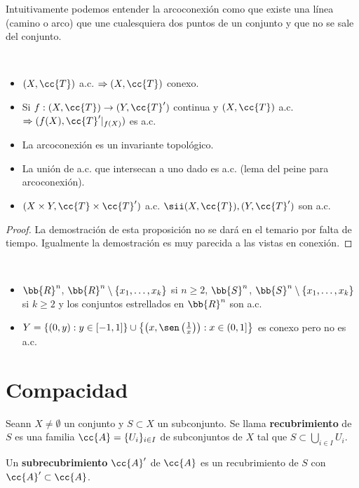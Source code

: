 Intuitivamente podemos entender la arcoconexión como que existe una línea (camino o arco) que une cualesquiera dos puntos de un conjunto y que no se sale del conjunto.

\begin{prop}\
    \begin{itemize}
        \item $(X, \cc{T})$ a.c. $\Rightarrow (X, \cc{T})$ conexo.
        \item Si $f:(X, \cc{T})\to (Y, \cc{T}')$ continua y $(X, \cc{T})$ a.c. $\Rightarrow (f(X), \cc{T}'|_{f(X)})$ es a.c.
        \item La arcoconexión es un invariante topológico.
        \item La unión de a.c. que intersecan a uno dado es a.c. (lema del peine para arcoconexión).
        \item $(X\times Y, \cc{T}\times \cc{T}')$ a.c. $\sii (X, \cc{T}), (Y, \cc{T}')$ son a.c.
    \end{itemize}
    \begin{proof}
        La demostración de esta proposición no se dará en el temario por falta de tiempo. Igualmente la demostración es muy parecida a las vistas en conexión.
    \end{proof}
\end{prop}

\begin{ejemplo}\
    \begin{itemize}
        \item $\bb{R}^n$, $\bb{R}^n\setminus \{x_1,\dots,x_k\}$ si $n\geq 2$, $\bb{S}^n$, $\bb{S}^n\setminus \{x_1,\dots,x_k\}$ si $k\geq 2$ y los conjuntos estrellados en $\bb{R}^n$ son a.c.
        \item $Y=\{(0,y):y\in [-1,1]\}\cup \left\{\left(x,\sen\left(\frac{1}{x}\right)\right): x\in (0,1]\right\}$ es conexo pero no es a.c.
    \end{itemize}
    \endsquare
\end{ejemplo}

\section{Compacidad}

\begin{definicion}
    Seann $X\neq \emptyset$ un conjunto y $S\subset X$ un subconjunto. Se llama \textbf{recubrimiento} de $S$ es una familia $\cc{A}=\{U_i\}_{i\in I}$ de subconjuntos de $X$ tal que $S\subset \bigcup\limits_{i\in I}U_i$.

    Un \textbf{subrecubrimiento} $\cc{A}'$ de $\cc{A}$ es un recubrimiento de $S$ con $\cc{A}'\subset\cc{A}$.
    \endsquare
\end{definicion}

